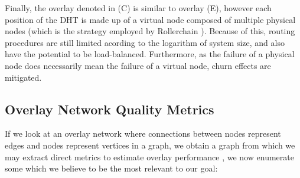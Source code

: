 Finally, the overlay denoted in (C) is similar to overlay (E), however each position of the DHT is made up of a virtual node composed of multiple physical nodes (which is the strategy employed by Rollerchain \cite{rollerchain}). Because of this, routing procedures are still limited acording to the logarithm of system size, and also have the potential to be load-balanced. Furthermore, as the failure of a physical node does necessarily mean the failure of a virtual node, churn effects are mitigated. 
 
\subsection{Overlay Network Quality Metrics}

If we look at an overlay network where connections between nodes represent edges and nodes represent vertices in a graph, we obtain a graph from which we may extract direct metrics to estimate overlay performance \cite{leitaoPHDthesis}, we now enumerate some which we believe to be the most relevant to our goal:

